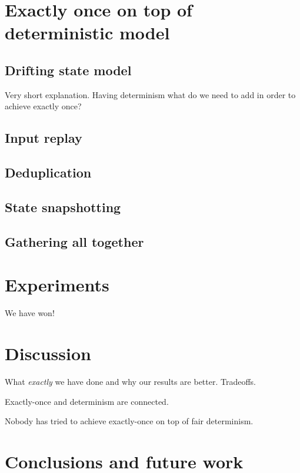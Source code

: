 \documentclass[sigconf]{acmart}
\theoremstyle{remark}
\begin{document}
\section{Exactly once on top of deterministic model}

\subsection{Drifting state model}

Very short explanation. Having determinism what do we need to add in order to achieve exactly once?

\subsection{Input replay}

\subsection{Deduplication}

\subsection{State snapshotting}

\subsection{Gathering all together}

\section{Experiments}

We have won!

\section{Discussion}

What {\em exactly} we have done and why our results are better. Tradeoffs.

Exactly-once and determinism are connected.

Nobody has tried to achieve exactly-once on top of fair determinism.

\section{Conclusions and future work}




\end{document}
